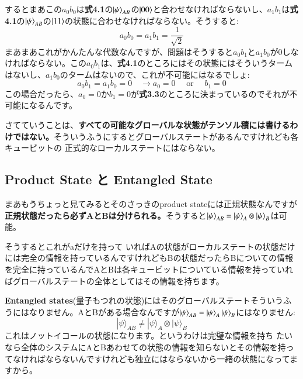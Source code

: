するとまあこの$a_0b_0$は\textbf{式4.1}の$\ket{\psi}_{AB}$の$\ket{00}$と合わせなければならないし、$a_1b_1$は\textbf{式4.1}の$\ket{\psi}_{AB}$の$\ket{11}$の状態に合わせなければならない。そうすると:
\begin{equation}
a_{0} b_{0}=a_{1} b_{1}=\frac{1}{\sqrt{2}}
\end{equation}
まあまあこれがかんたんな代数なんですが、問題はそうすると$a_0b_1$と$a_1b_0$が0しなければならない。この$a_0b_1$は、\textbf{式4.1}のところにはその状態にはそういうタームはないし、$a_1b_0$のタームはないので、これが不可能にはなるでしょ:
\begin{equation}
a_{0} b_{1}=a_{1} b_{0}=0 \quad \longrightarrow a_{0}=0 \quad \text { or } \quad b_{1}=0
\end{equation}
この場合だったら、$a_0=0$か$b_1=0$が\textbf{式3.3}のところに決まっているのでそれが不可能になるんです。

さてていうことは、\textbf{すべての可能なグローバルな状態がテンソル積には書けるわけではない。}そういうふうにするとグローバルステートがあるんですけれども各キュービットの
正式的なローカルステートにはならない。
\subsection{Product State と Entangled State}
まあもうちょっと見てみるとそのさっきのproduct stateには正規状態なんですが\textbf{正規状態だったら必ずAとBは分けられる。}そうすると$\ket{\psi}_{AB} = \ket{\psi}_A \otimes \ket{\psi}_B$は可能。

そうするとこれがaだけを持って
いればAの状態がローカルステートの状態だけには完全の情報を持っているんですけれどもBの状態だったらBについての情報を完全に持っているんでAとBは各キュービットについている情報を持っていればグローバルステートの全体としてはその情報を持ちます。

\textbf{Entangled states}(量子もつれの状態)にはそのグローバルステートそういうふうにはなりません。AとBがある場合なんですが$\ket{\psi}_{AB}= \ket{\psi}_A\ket{\psi}_B$にはなりません:
\begin{equation}
|\psi\rangle_{A B} \neq|\psi\rangle_{A} \otimes|\psi\rangle_{B}
\end{equation}
これはノットイコールの状態になります。というわけは完璧な情報を持ち
たいなら全体のシステムにAとBあわせての状態の情報を知らないとその情報を持ってなければならないんですけれども独立にはならないから一緒の状態になってますから。


